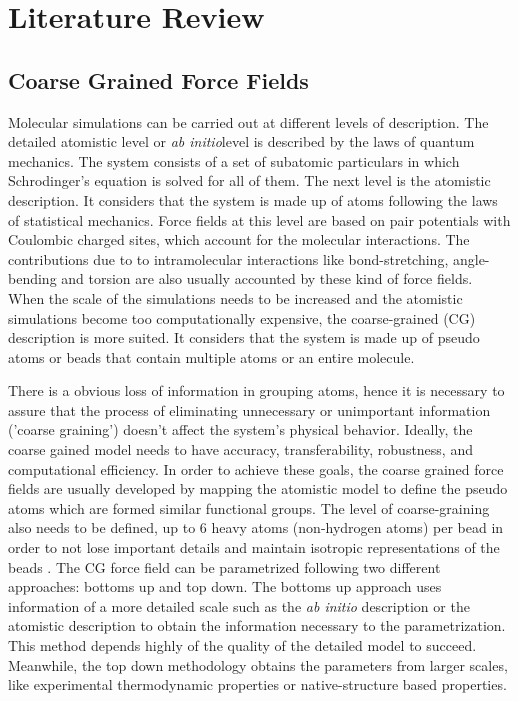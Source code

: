 
\chapter{Literature Review} %

\label{Chapter2} %



\section{Coarse Grained Force Fields}

Molecular simulations can be carried out at different levels of description. The detailed atomistic level or \textit{ab initio}level is described by the laws of quantum mechanics. The system consists of a set of subatomic particulars in which Schrodinger's equation is solved for all of them. The next level is the atomistic description. It considers that the system is made up of atoms following the laws of statistical mechanics.  Force fields at this level are based on pair potentials with Coulombic charged sites, which account for the molecular interactions. The contributions due to to intramolecular interactions like bond-stretching, angle-bending and torsion are also usually accounted by these kind of force fields. When the scale of the simulations needs to be increased and the atomistic simulations become too computationally expensive, the coarse-grained (CG) description is more suited. It considers that the system is made up of pseudo atoms or beads that contain multiple atoms or an entire molecule. 

There is a obvious loss of information in grouping atoms, hence it is necessary to assure that the process of eliminating unnecessary or unimportant information ('coarse graining') doesn't affect the system's physical behavior. Ideally, the coarse gained model needs to have accuracy, transferability, robustness, and computational efficiency. In order to achieve these goals, the coarse grained force fields are usually developed by mapping the atomistic model to define the pseudo atoms which are formed similar functional groups. The level of coarse-graining also needs to be defined, up to 6 heavy atoms (non-hydrogen atoms) per bead in order to not lose important details and maintain isotropic representations of the beads \cite{shinoda2007,martini2007,hadley2012}. The CG force field can be parametrized following two different approaches: bottoms up and top down. The bottoms up approach uses information of a more detailed scale such as the \textit{ab initio} description or the atomistic description to obtain the information necessary to the parametrization. This method depends highly of the quality of the detailed model to succeed. Meanwhile, the top down methodology obtains the parameters from larger scales, like experimental thermodynamic properties or native-structure based properties. 

